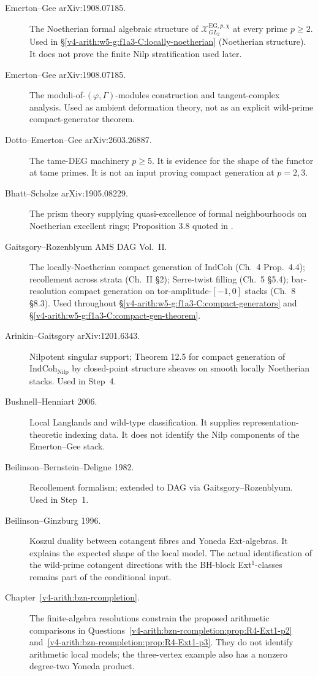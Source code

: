 \begin{description}
\item[Emerton--Gee arXiv:1908.07185.] The Noetherian formal algebraic
structure of \(\mathcal{X}^{\mathrm{EG},p,\chi}_{GL_{2}}\) at every
prime \(p\geq 2\). Used in \S\ref{v4-arith:w5-g:f1a3-C:locally-noetherian}
(Noetherian structure). It does not prove the finite Nilp
stratification used later.
\item[Emerton--Gee arXiv:1908.07185.] The moduli-of-\((\varphi,\Gamma)\)-modules
construction and tangent-complex analysis. Used as ambient
deformation theory, not as an explicit wild-prime compact-generator
theorem.
\item[Dotto--Emerton--Gee arXiv:2603.26887.] The tame-DEG machinery
\(p\geq 5\). It is evidence for the shape of the functor at tame
primes. It is not an input proving compact generation at \(p=2,3\).
\item[Bhatt--Scholze arXiv:1905.08229.] The prism theory supplying
quasi-excellence of formal neighbourhoods on Noetherian excellent
rings; Proposition 3.8 quoted in
.
\item[Gaitsgory--Rozenblyum AMS DAG Vol.~II.] The locally-Noetherian
compact generation of \(\mathrm{IndCoh}\) (Ch.~4 Prop.~4.4); recollement
across strata (Ch.~II \S 2); Serre-twist filling (Ch.~5 \S 5.4);
bar-resolution compact generation on tor-amplitude-\([-1,0]\) stacks
(Ch.~8 \S 8.3). Used throughout \S\ref{v4-arith:w5-g:f1a3-C:compact-generators}
and \S\ref{v4-arith:w5-g:f1a3-C:compact-gen-theorem}.
\item[Arinkin--Gaitsgory arXiv:1201.6343.] Nilpotent singular support;
Theorem 12.5 for compact generation of
\(\mathrm{IndCoh}_{\mathrm{Nilp}}\) by closed-point structure sheaves on
smooth locally Noetherian stacks. Used in
 Step~4.
\item[Bushnell--Henniart 2006.] Local Langlands and wild-type
classification. It supplies representation-theoretic indexing data.
It does not identify the Nilp components of the Emerton--Gee stack.
\item[Beilinson--Bernstein--Deligne 1982.] Recollement formalism;
extended to DAG via Gaitsgory--Rozenblyum. Used in
 Step~1.
\item[Beilinson--Ginzburg 1996.] Koszul duality between cotangent fibres
and Yoneda Ext-algebras. It explains the expected shape of the local
model. The actual identification of the wild-prime cotangent directions
with the BH-block Ext\({}^{1}\)-classes remains part of the conditional
input.
\item[Chapter~\ref{v4-arith:bzn-rcompletion}.] The finite-algebra
resolutions constrain the proposed arithmetic comparisons in
Questions~\ref{v4-arith:bzn-rcompletion:prop:R4-Ext1-p2}
and~\ref{v4-arith:bzn-rcompletion:prop:R4-Ext1-p3}.
They do not identify arithmetic local models; the three-vertex
example also has a nonzero degree-two Yoneda product.
\end{description}

